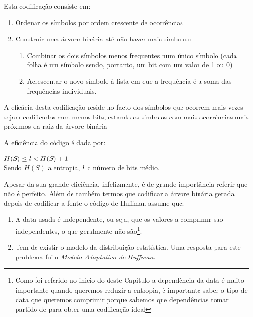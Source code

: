 \documentclass[11pt,journal,compsoc]{IEEEtran}
\begin{document}
    Esta codificação consiste em:
    \begin{enumerate}
        \item Ordenar os símbolos por ordem crescente de ocorrências
        \item Construir uma árvore binária até não haver mais símbolos:
        \begin{enumerate}
            \item Combinar os dois símbolos menos frequentes num único símbolo (cada folha é um símbolo sendo, portanto, um bit com um valor de 1 ou 0)
            \item Acrescentar o novo símbolo à lista em que a frequência é a soma das frequências individuais.
        \end{enumerate}
    \end{enumerate}
    A eficácia desta codificação reside no facto dos símbolos que ocorrem mais vezes sejam codificados com menos bits, estando os símbolos com mais ocorrências mais próximos da raiz da árvore binária.
    
    A eficiência do código é dada por:
    \begin{center}
    \begin{math}H(S)\leq\Bar{l}<H(S)+1\end{math}\\
    \small Sendo \begin{math}H(S)\end{math} a entropia, \begin{math}\Bar{l}\end{math} o número de bits médio.  
    \end{center}
    
    Apesar da sua grande eficiência, infelizmente, é de grande importância referir que não é perfeito. Além de também termos que codificar a árvore binária gerada depois de codificar a fonte o código de Huffman assume que:
    \begin{enumerate}
        \item A data usada é independente, ou seja, que os valores a comprimir são independentes, o que geralmente não são\footnote{Como foi referido no inicio do deste Capitulo a dependência da data é muito importante quando queremos reduzir a entropia, é importante saber o tipo de data que queremos comprimir porque sabemos que dependências tomar partido de para obter uma codificação ideal}.
        \item Tem de existir o modelo da distribuição estatística. Uma resposta para este problema foi o \textit{Modelo Adaptativo de Huffman}.
    \end{enumerate}
    
\end{document}
